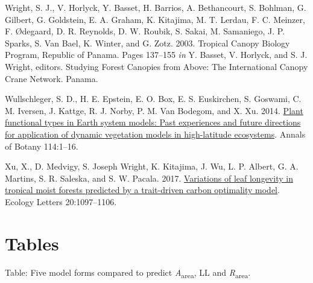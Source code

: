 \documentclass[
  12pt,
]{article}
\newlength{\cslhangindent} %
\newlength{\cslentryspacingunit} %
\newenvironment{CSLReferences}[2] %
 {%
  \setlength{\parindent}{0pt} %
  \ifodd #1 %
  \let\oldpar\par %
  \def\par{\hangindent=\cslhangindent\oldpar} %
  \fi %
  \setlength{\parskip}{#2\cslentryspacingunit} %
 }%
 {} %
\providecommand{\DIFaddtex}[1]{{\protect\color{blue}\uwave{#1}}} %
\providecommand{\DIFaddbegin}{} %
\providecommand{\DIFaddend}{} %
\providecommand{\DIFdelbegin}{} %
\providecommand{\DIFdelend}{} %
\providecommand{\DIFadd}[1]{\texorpdfstring{\DIFaddtex{#1}}{#1}} %
\newcommand{\DIFscaledelfig}{0.5}
\newlength{\DIFdelgraphicswidth} %
\newlength{\DIFdelgraphicsheight} %
\newcommand{\DIFaddincludegraphics}[2][]{{\color{blue}\fbox{\DIFOincludegraphics[#1]{#2}}}} %
\newcommand{\DIFdelincludegraphics}[2][]{%
\sbox{\DIFdelgraphicsbox}{\DIFOincludegraphics[#1]{#2}}%
\settoboxwidth{\DIFdelgraphicswidth}{\DIFdelgraphicsbox} %
\settoboxtotalheight{\DIFdelgraphicsheight}{\DIFdelgraphicsbox} %
\scalebox{\DIFscaledelfig}{%
\parbox[b]{\DIFdelgraphicswidth}{\usebox{\DIFdelgraphicsbox}\\[-\baselineskip] \rule{\DIFdelgraphicswidth}{0em}}\llap{\resizebox{\DIFdelgraphicswidth}{\DIFdelgraphicsheight}{%
\setlength{\unitlength}{\DIFdelgraphicswidth}%
\begin{picture}(1,1)%
\thicklines\linethickness{2pt} %
{\color[rgb]{1,0,0}\put(0,0){\framebox(1,1){}}}%
{\color[rgb]{1,0,0}\put(0,0){\line( 1,1){1}}}%
{\color[rgb]{1,0,0}\put(0,1){\line(1,-1){1}}}%
\end{picture}%
}\hspace*{3pt}}} %
} %
\DeclareRobustCommand{\DIFaddbegin}{\DIFOaddbegin \let\includegraphics\DIFaddincludegraphics} %
\DeclareRobustCommand{\DIFaddend}{\DIFOaddend \let\includegraphics\DIFOincludegraphics} %
\DeclareRobustCommand{\DIFdelbegin}{\DIFOdelbegin \let\includegraphics\DIFdelincludegraphics} %
\DeclareRobustCommand{\DIFdelend}{\DIFOaddend \let\includegraphics\DIFOincludegraphics} %
\begin{document}
\begin{CSLReferences}{1}{0}
\leavevmode{}%
Wright, S. J., V. Horlyck, Y. Basset, H. Barrios, A. Bethancourt, S. Bohlman, G. Gilbert, G. Goldstein, E. A. Graham, K. Kitajima, M. T. Lerdau, F. C. Meinzer, F. Ødegaard, D. R. Reynolds, D. W. Roubik, S. Sakai, M. Samaniego, J. P. Sparks, S. Van Bael, K. Winter, and G. Zotz. 2003. Tropical {Canopy Biology Program}, {Republic} of {Panama}. Pages 137--155 \emph{in} Y. Basset, V. Horlyck, and S. J. Wright, editors. Studying {Forest Canopies} from {Above}: {The International Canopy Crane Network}. {Panama}.

\leavevmode{}%
Wullschleger, S. D., H. E. Epstein, E. O. Box, E. S. Euskirchen, S. Goswami, C. M. Iversen, J. Kattge, R. J. Norby, P. M. Van Bodegom, and X. Xu. 2014. \href{https://doi.org/10.1093/aob/mcu077}{Plant functional types in {Earth} system models: {Past} experiences and future directions for application of dynamic vegetation models in high-latitude ecosystems}. Annals of Botany 114:1--16.

\leavevmode{}%
Xu, X., D. Medvigy, S. Joseph Wright, K. Kitajima, J. Wu, L. P. Albert, G. A. Martins, S. R. Saleska, and S. W. Pacala. 2017. \href{https://doi.org/10.1111/ele.12804}{Variations of leaf longevity in tropical moist forests predicted by a trait-driven carbon optimality model}. Ecology Letters 20:1097--1106.

\end{CSLReferences}

\DIFaddbegin \texttt{\DIFadd{\#r\ page\_break("Tables")}}

\DIFaddend \newpage

\hypertarget{tables}{%
\section{Tables}\label{tables}}

\DIFdelbegin %

\DIFdelend Table: \label{tab:modeltab} Five model forms compared to predict \emph{A}\textsubscript{area}, LL and \emph{R}\textsubscript{area}.
\end{document}
